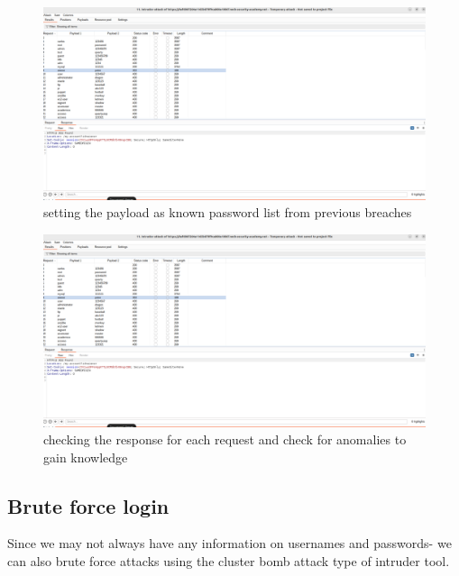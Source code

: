 \documentclass[
	a4paper, %
	12pt, %
]{CSSullivanBusinessReport}
\begin{document}
\begin{fullwidth}
\begin{fullwidth}
 \begin{figure}[H]
    \centering
    \includegraphics[width=1\textwidth]{Images/anikaScreensots/credentialStuff3.png}
    \caption{setting the payload as known password list from previous breaches}
    \label{fig:enter-label}
\end{figure}

 \begin{figure}[H]
    \centering
    \includegraphics[width=1\textwidth]{Images/anikaScreensots/credentialStuff3.png}
    \caption{checking the response for each request and check for anomalies to gain knowledge}
    \label{fig:enter-label}
\end{figure}
 

\end{fullwidth}
\subsection*{Brute force login}

\begin{fullwidth}
    Since we may not always have any information on usernames and passwords- we can also brute force attacks using the cluster bomb attack type of intruder tool.



\end{fullwidth}
\end{fullwidth}
\end{document}
